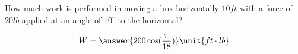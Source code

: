 \documentclass{ximera}
\author{Gregory Hartman \and Matthew Carr}
\begin{document}
\begin{exercise}




How much work is performed in moving a box horizontally $10\unit{ft}$ with a force of $20\unit{lb}$ applied at an angle of $10^{\circ}$ to the horizontal?

\begin{prompt}
\[
W=\answer{200\cos(\frac{\pi}{18})}\unit{ft\cdot lb}
\]
\end{prompt}

\end{exercise}
\end{document}
